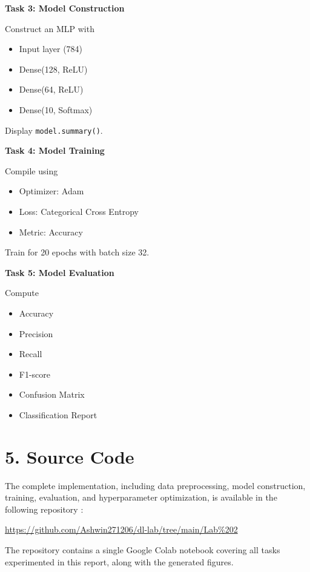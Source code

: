 \documentclass[11pt]{article}
\begin{document}
\bigskip

\textbf{Task 3: Model Construction}

Construct an MLP with

\begin{itemize}
\item Input layer (784)
\item Dense(128, ReLU)
\item Dense(64, ReLU)
\item Dense(10, Softmax)
\end{itemize}

Display \texttt{model.summary()}.

\bigskip

\textbf{Task 4: Model Training}

Compile using

\begin{itemize}
\item Optimizer: Adam
\item Loss: Categorical Cross Entropy
\item Metric: Accuracy
\end{itemize}

Train for 20 epochs with batch size 32.

\bigskip

\textbf{Task 5: Model Evaluation}

Compute

\begin{itemize}
\item Accuracy
\item Precision
\item Recall
\item F1-score
\item Confusion Matrix
\item Classification Report
\end{itemize}

\section*{5. Source Code}

The complete implementation, including data preprocessing, model construction, training, evaluation, and hyperparameter optimization, is available in the following repository :

\url{https://github.com/Ashwin271206/dl-lab/tree/main/Lab%202}

The repository contains a single Google Colab notebook covering all tasks experimented in this report, along with the generated figures.
\end{document}
